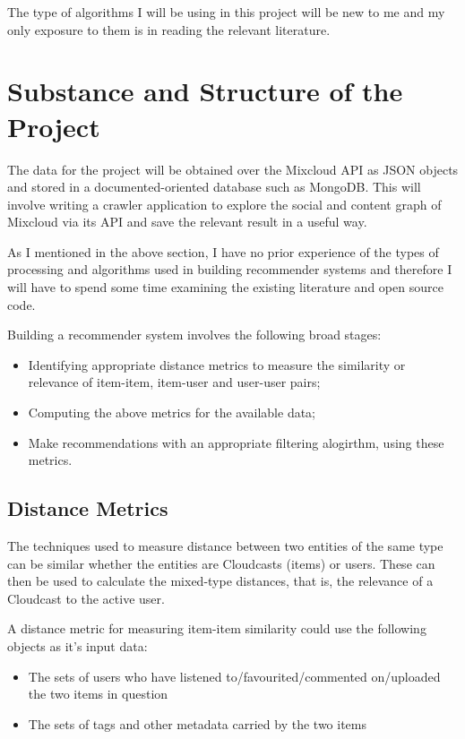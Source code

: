 The type of algorithms I will be using in this project will be new to me and my only exposure to them is in reading the relevant literature.
  
\section{Substance and Structure of the Project}

The data for the project will be obtained over the Mixcloud API as JSON objects and stored in a documented-oriented database such as MongoDB. This will involve writing a crawler application to explore the social and content graph of Mixcloud via its API and save the relevant result in a useful way.

As I mentioned in the above section, I have no prior experience of the types of processing and algorithms used in building recommender systems and therefore I will have to spend some time examining the existing literature and open source code.

Building a recommender system involves the following broad stages: 
\begin{itemize}
 \item Identifying appropriate distance metrics to measure the similarity or relevance of item-item, item-user and user-user pairs;
 \item Computing the above metrics for the available data;
 \item Make recommendations with an appropriate filtering alogirthm, using these metrics.
\end{itemize}

\subsection*{Distance Metrics}

The techniques used to measure distance between two entities of the same type can be similar whether the entities are Cloudcasts (items) or users. These can then be used to calculate the mixed-type distances, that is, the relevance of a Cloudcast to the active user.

A distance metric for measuring item-item similarity could use the following objects as it's input data: 
\begin{itemize}
 \item The sets of users who have listened to/favourited/commented on/uploaded the two items in question
 \item The sets of tags and other metadata carried by the two items 
\end{itemize}


